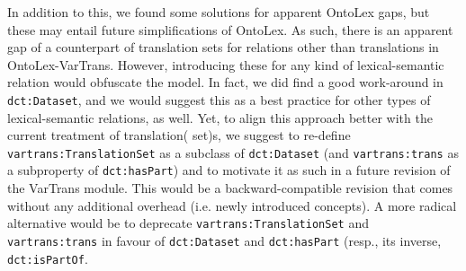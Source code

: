 \documentclass[11pt]{article}
\newcommand{\onto}[1]{\texttt{#1}} %
\begin{document}
In addition to this, we found some solutions for apparent OntoLex gaps, but these may entail future simplifications of OntoLex.
As such, there is an apparent gap of a counterpart of translation sets for relations other than translations in OntoLex-VarTrans. 
However, introducing these for any kind of lexical-semantic relation would obfuscate the model. In fact, we did find a good work-around in \onto{dct:Dataset}, and we would suggest this as a best practice for other types of lexical-semantic relations, as well. Yet, to align this approach better with the current treatment of translation( set)s, we suggest to re-define \onto{vartrans:TranslationSet} as a subclass of \onto{dct:Dataset} (and \onto{vartrans:trans} as a subproperty of \onto{dct:hasPart}) and to motivate it as such in a future revision of the VarTrans module. This would be a backward-compatible revision that comes without any additional overhead (i.e. newly introduced concepts). A more radical alternative would be to deprecate \onto{vartrans:TranslationSet} and \onto{vartrans:trans} in favour of \onto{dct:Dataset} and \onto{dct:hasPart} (resp., its inverse, \onto{dct:isPartOf}.
\end{document}
